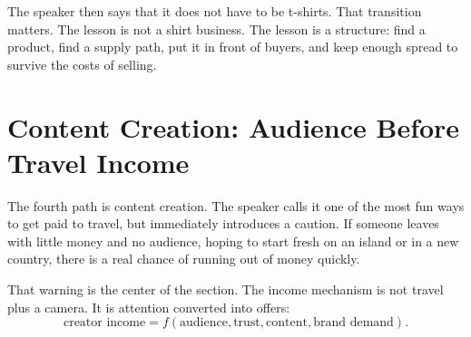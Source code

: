 \begin{figure}
\centering
{}
\end{figure}

The speaker then says that it does not have to be t-shirts. That transition matters. The lesson is not a shirt business. The lesson is a structure: find a product, find a supply path, put it in front of buyers, and keep enough spread to survive the costs of selling.

\section{Content Creation: Audience Before Travel Income}

The fourth path is content creation. The speaker calls it one of the most fun ways to get paid to travel, but immediately introduces a caution. If someone leaves with little money and no audience, hoping to start fresh on an island or in a new country, there is a real chance of running out of money quickly.

That warning is the center of the section. The income mechanism is not travel plus a camera. It is attention converted into offers:
\begin{equation}
\text{creator income}
=
f(\text{audience},\text{trust},\text{content},\text{brand demand}).
\end{equation}

